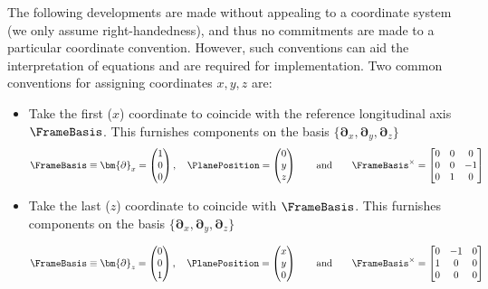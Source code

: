 \begin{remark}
The following developments are made without appealing to a coordinate system (we only assume right-handedness), and thus no commitments are made to a particular coordinate convention. However, such conventions can aid the interpretation of equations and are required for implementation. 
Two common conventions for assigning coordinates \(x,y,z\) are:
\begin{itemize}
    \item Take the first (\(x\)) coordinate to coincide with the reference longitudinal axis \(\FrameBasis\). This furnishes components on the basis \(\{\bm{\partial}_x,\bm{\partial}_y,\bm{\partial}_z\}\)
    \[
    \FrameBasis \equiv \bm{\partial}_x = \begin{pmatrix}
        1 \\ 0 \\ 0
    \end{pmatrix},
    \quad
    \PlanePosition = \begin{pmatrix}
    0 \\ y \\ z
    \end{pmatrix}
    \qquad\text{and}\qquad 
    \FrameBasis^{\times} = \begin{bmatrix}
        0 & 0 & 0 \\
        0 & 0 & -1 \\
        0 & 1 & 0
    \end{bmatrix}
    \]
    \item Take the last (\(z\)) coordinate to coincide with \(\FrameBasis\). This furnishes components on the basis \(\{\bm{\partial}_x,\bm{\partial}_y,\bm{\partial}_z\}\)
    
    \[
    \FrameBasis \equiv \bm{\partial}_z = \begin{pmatrix}
        0 \\ 0 \\ 1
    \end{pmatrix},
    \quad
    \PlanePosition = \begin{pmatrix}
    x \\ y \\ 0
    \end{pmatrix}
    \qquad\text{and}\qquad 
    \FrameBasis^{\times} = \begin{bmatrix}
        0 & -1 & 0 \\
        1 &  0 & 0 \\
        0 & 0 & 0
    \end{bmatrix}
    \]
\end{itemize}
\end{remark}

